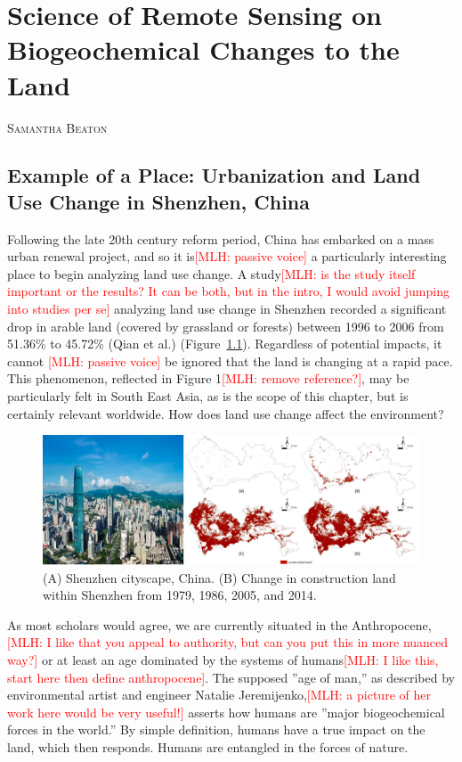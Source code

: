 \documentclass{book}\usepackage{knitr}
\makeatletter
\newcommand{\red}[1]{\textcolor{red}{[MLH: #1]}}
\newcommand{\chapterauthor}[1]{%
  {\parindent0pt\vspace*{-25pt}%
  \linespread{1.1}\large\scshape#1%
  \par\nobreak\vspace*{35pt}}
  \@afterheading%
}
\makeatother
\begin{document}
\chapter[Land Use Change and Monitoring]{Science of Remote Sensing on Biogeochemical Changes to the Land}

\chapterauthor{Samantha Beaton}

\section{Example of a Place: Urbanization and Land Use Change in Shenzhen, China}

Following the late 20th century reform period, China has embarked on a mass urban renewal project, and so it is\red{passive voice} a particularly interesting place to begin analyzing land use change. A study\red{is the study itself important or the results? It can be both, but in the intro, I would avoid jumping into studies per se} analyzing land use change in Shenzhen recorded a significant drop in arable land (covered by grassland or forests) between 1996 to 2006 from 51.36\% to 45.72\% (Qian et al.) (Figure~\ref{fig:shenzhen}). Regardless of potential impacts, it cannot \red{passive voice} be ignored that the land is changing at a rapid pace. This phenomenon, reflected in Figure 1\red{remove reference?}, may be particularly felt in South East Asia, as is the scope of this chapter, but is certainly relevant worldwide. How does land use change affect the environment?

\begin{figure}
\includegraphics[width=\linewidth]{images/land-use/Shenzhen-cityscape.png}
\caption{(A) Shenzhen cityscape, China. (B) Change in construction land within Shenzhen from 1979, 1986, 2005, and 2014.}
\label{fig:shenzhen}
\end{figure}

As most scholars would agree, we are currently situated in the Anthropocene, \red{I like that you appeal to authority, but can you put this in more nuanced way?} or at least an age dominated by the systems of humans\red{I like this, start here then define anthropocene}. The supposed ''age of man,'' as described by environmental artist and engineer Natalie Jeremijenko,\red{a picture of her work here would be very useful!} asserts how humans are ''major biogeochemical forces in the world.'' By simple definition, humans have a true impact on the land, which then responds. Humans are entangled in the forces of nature. 
\end{document}

